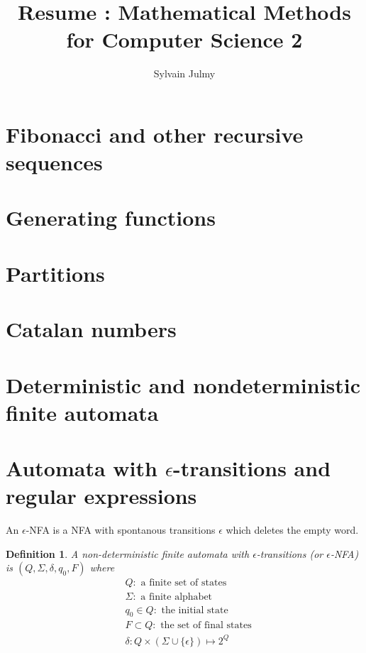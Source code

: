 \documentclass[a4paper,11pt]{article}
\title{Resume : Mathematical Methods for Computer Science 2}
\author{Sylvain Julmy}
\newtheorem{mydef}{Definition}
\begin{document}
\maketitle

\section{Fibonacci and other recursive sequences}

\section{Generating functions}

\section{Partitions}

\section{Catalan numbers}

\section{Deterministic and nondeterministic finite automata}

\section{Automata with $\epsilon$-transitions and regular expressions}

An $\epsilon$-NFA is a NFA with spontanous transitions $\epsilon$ which deletes
the empty word.

\begin{mydef}
  A non-deterministic finite automata with $\epsilon$-transitions (or
  $\epsilon$-NFA) is $(Q,\Sigma,\delta,q_0,F)$ where
  \begin{align*}
    &Q : \text{ a finite set of states} \\
    &\Sigma : \text{ a finite alphabet} \\
    &q_0 \in Q : \text{ the initial state} \\
    &F \subset Q : \text{ the set of final states} \\
    &\delta : Q \times (\Sigma \cup \{\epsilon\}) \mapsto 2^Q
  \end{align*}
\end{mydef}
\end{document}
